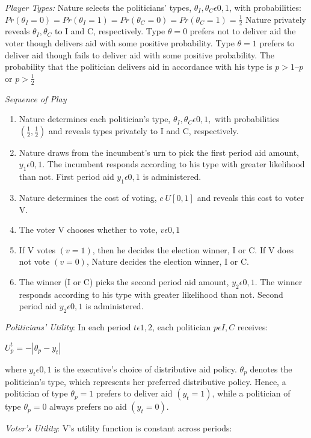 \documentclass[12pt]{paper}
\begin{document}
\emph{Player Types:} Nature selects the politicians’ types, $\theta_I,\theta_C \epsilon {0,1}$, with probabilities: $Pr(\theta_I=0)=Pr(\theta_I=1)=Pr(\theta_C=0)=Pr(\theta_C=1)= \frac{1}{2}$ Nature privately reveals $\theta_I,\theta_C$ to I and C, respectively. Type $\theta=0$ prefers not to deliver aid the voter though delivers aid with some positive probability. Type $\theta=1$ prefers to deliver aid though fails to deliver aid with some positive probability. The probability that the politician delivers aid in accordance with his type is $p > 1 – p$ or $p > \frac{1}{2}$

\emph{Sequence of Play}
\begin{enumerate}
	\item Nature determines each politician’s type, $\theta_I, \theta_C \epsilon {0,1},$ with probabilities $(\frac{1}{2}, \frac{1}{2})$ and reveals types privately to I and C, respectively.
	\item Nature draws from the incumbent’s urn to pick the first period aid amount, $y_1\epsilon {0,1}.$ The incumbent responds according to his type with greater likelihood than not. First period aid $y_1\epsilon {0,1}$ is administered.
	\item Nature determines the cost of voting, $c~U[0,1]$ and reveals this cost to voter V.
	\item The voter V chooses whether to vote, $v\epsilon{0,1}$
	\item If V votes $(v=1)$, then he decides the election winner, I or C. If V does not vote $(v=0)$, Nature decides the election winner, I or C.
	\item The winner (I or C) picks the second period aid amount, $y_2\epsilon {0,1}$. The winner responds according to his type with greater likelihood than not. Second period aid  $y_2 \epsilon {0,1}$ is administered.
\end{enumerate}

\emph{Politicians' Utility}: In each period $t\epsilon{1,2}$, each politician $p\epsilon{I,C}$ receives: 

$U_{p}^t = -|\theta_p - y_t|$

where $y_t\epsilon {0,1}$ is the executive’s choice of distributive aid policy. $\theta_p$ denotes the politician’s type, which represents her preferred distributive policy. Hence, a politician of type $\theta_p=1$ prefers to deliver aid $(y_t=1)$, while a politician of type $\theta_p=0$ always prefers no aid $(y_t=0).$

\emph{Voter's Utility}: V’s utility function is constant across periods: 
\end{document}
